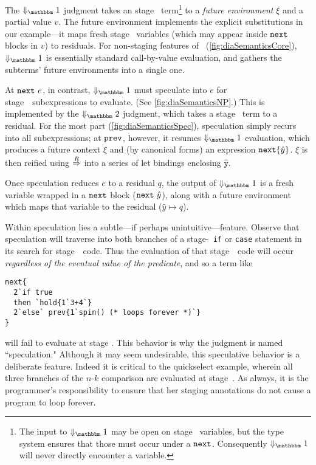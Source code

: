 


The $\redonesym$ judgment takes an stage \bbone\ term\footnote{
The input to $\redonesym$ may be open on stage \bbtwo\ variables,
but the type system ensures that those must occur under a ${\tt next}$.
Consequently $\redonesym$ will never directly encounter a variable.
} to a {\em future environment} $\xi$ and a partial value $v$.  
The future environment implements
the explicit substitutions in our example---it maps fresh stage \bbtwo\
variables (which may appear inside ${\tt next}$ blocks in $v$) to
residuals. For non-staging features of \lang\ (\ref{fig:diaSemanticsCore}),
$\redonesym$ is essentially standard call-by-value evaluation, and gathers the
subterms' future environments into a single one.

At ${\tt next}~e$, in contrast, $\redonesym$ must speculate into $e$ for stage~\bbone\ 
subexpressions to evaluate.  (See \ref{fig:diaSemanticsNP}.)
This is implemented by the $\redtwosym$ judgment, which takes a stage \bbtwo\ term to a residual. 
For the most part (\ref{fig:diaSemanticsSpec}), speculation simply recurs into
all subexpressions; at ${\tt prev}$, however, it resumes $\redonesym$ evaluation,
which produces a future context $\xi$ and (by canonical forms) an expression
${\tt next}\{\hat y\}$. $\xi$ is then reified using $\overset{R}\Rightarrow$ into a series of let
bindings enclosing $\mathtt{\hat y}$.

Once speculation reduces $e$ to a residual $q$, the output of $\redonesym$ is a
fresh variable wrapped in a ${\tt next}$ block (${\tt next}~\hat y$), along with a future
environment which maps that variable to the residual ($\hat y \mapsto q$).

Within speculation lies a subtle---if perhaps unintuitive---feature.  
Observe that speculation will traverse into both branches of a stage-\bbtwo\ {\tt if} or {\tt case} 
statement in its search for stage~\bbone\ code. 
Thus the evaluation of that stage~\bbone\ code will occur {\em regardless of the eventual value of the predicate},
and so a term like 
\begin{lstlisting} 
next{
  2`if true 
  then `hold{1`3+4`} 
  2`else` prev{1`spin() (* loops forever *)`}
}
\end{lstlisting}
will fail to evaluate at stage \bbone.
This behavior is why the judgment is named ``speculation."
Although it may seem undesirable, this speculative behavior is a deliberate feature.
Indeed it is critical to the quickselect example, 
wherein all three branches of the $n$-$k$ comparison are evaluated at stage~\bbone.
As always, it is the programmer's responsibility to ensure that her staging annotations 
do not cause a program to loop forever.  

